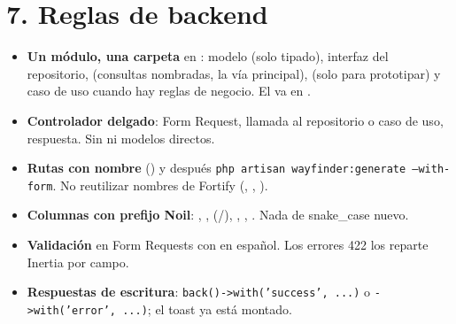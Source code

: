 \documentclass[11pt]{article}
\begin{document}
\section{7. Reglas de backend}
\begin{itemize}[leftmargin=1.2em,itemsep=2pt]
  \item \textbf{Un m\'odulo, una carpeta} en : modelo (solo tipado), interfaz del repositorio,  (consultas nombradas, la v\'ia principal),  (solo para prototipar) y caso de uso cuando hay reglas de negocio. El  va en .
  \item \textbf{Controlador delgado}: Form Request, llamada al repositorio o caso de uso, respuesta. Sin  ni modelos directos.
  \item \textbf{Rutas con nombre} () y despu\'es \texttt{php artisan wayfinder:generate --with-form}. No reutilizar nombres de Fortify (, , ).
  \item \textbf{Columnas con prefijo Noil}: , ,  (/), , , . Nada de snake\_case nuevo.
  \item \textbf{Validaci\'on} en Form Requests con  en espa\~nol. Los errores 422 los reparte Inertia por campo.
  \item \textbf{Respuestas de escritura}: \texttt{back()->with('success', ...)} o \texttt{->with('error', ...)}; el toast ya est\'a montado.
\end{itemize}
\end{document}
